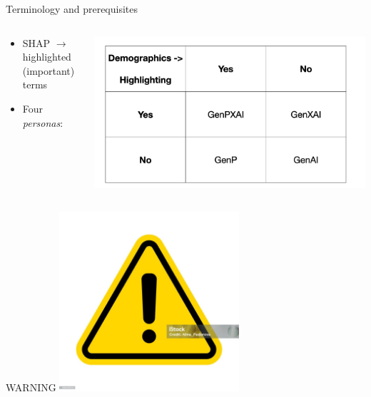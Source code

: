 \documentclass[t,xcolor={dvipsnames},final,aspectratio=169]{beamer}
\begin{document}
\begin{frame}{Terminology and prerequisites}
  \begin{columns}
    \begin{column}{0.5\textwidth}
\begin{itemize}
\item SHAP $\rightarrow$ highlighted (important) terms
\item Four \emph{personas}:
\end{itemize}
    \end{column}
    \begin{column}{0.5\textwidth}  %
    \begin{center}
\includegraphics[width=\textwidth]{img/categories.png}
\end{center}
    \end{column}
  \end{columns}
  \end{frame}
  
  \begin{frame}{WARNING}
\includegraphics[width=0.5\textwidth]{img/warning.jpg}
\end{frame}
\end{document}
